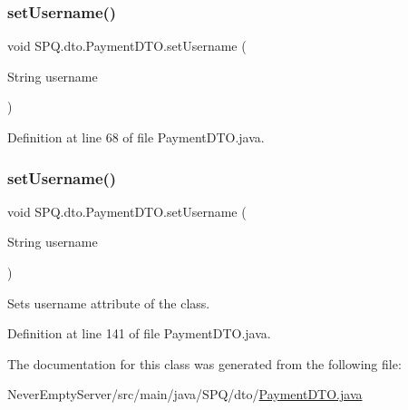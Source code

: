 \subsubsection{\texorpdfstring{set\+Username()}{setUsername()}\hspace{0.1cm}{\footnotesize\ttfamily [2/3]}}
{\footnotesize\ttfamily void S\+P\+Q.\+dto.\+Payment\+D\+T\+O.\+set\+Username (\begin{DoxyParamCaption}\item[{String}]{username }\end{DoxyParamCaption})}



Definition at line 68 of file Payment\+D\+T\+O.\+java.

\mbox{\label{class_s_p_q_1_1dto_1_1_payment_d_t_o_aaad1620f8f86cb26566476c22bfcd3af}} 
\subsubsection{\texorpdfstring{set\+Username()}{setUsername()}\hspace{0.1cm}{\footnotesize\ttfamily [3/3]}}
{\footnotesize\ttfamily void S\+P\+Q.\+dto.\+Payment\+D\+T\+O.\+set\+Username (\begin{DoxyParamCaption}\item[{String}]{username }\end{DoxyParamCaption})}

Sets username attribute of the class. 

Definition at line 141 of file Payment\+D\+T\+O.\+java.



The documentation for this class was generated from the following file\+:\begin{DoxyCompactItemize}
\item 
Never\+Empty\+Server/src/main/java/\+S\+P\+Q/dto/\mbox{\hyperlink{_never_empty_server_2src_2main_2java_2_s_p_q_2dto_2_payment_d_t_o_8java}{Payment\+D\+T\+O.\+java}}\end{DoxyCompactItemize}
